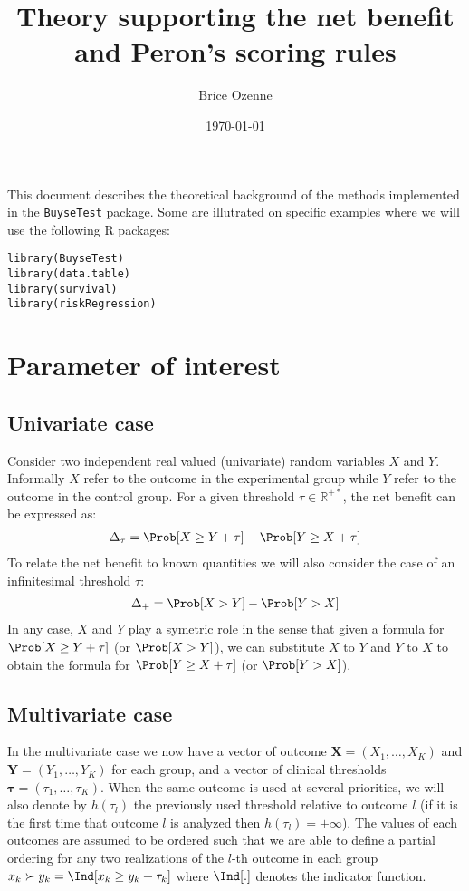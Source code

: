 \documentclass[12pt]{article}
\author{Brice Ozenne}
\date{\today}
\title{Theory supporting the net benefit and Peron's scoring rules}
\newcommand\VX{\mathbf{X}}
\newcommand\VY{\mathbf{Y}}
\newcommand\Vtau{\boldsymbol{\tau}}
\newcommand\Real{\mathbb{R}}
\begin{document}
\maketitle
This document describes the theoretical background of the methods
implemented in the \texttt{BuyseTest} package. Some are illutrated on
specific examples where we will use the following R packages:
\lstset{language=r,label= ,caption= ,captionpos=b,numbers=none}
\begin{lstlisting}
library(BuyseTest)
library(data.table)
library(survival)
library(riskRegression)
\end{lstlisting}

\bigskip

\tableofcontents

\clearpage

\section{Parameter of interest}
\label{sec:org1d8cd75}

\subsection{Univariate case}
\label{sec:org5ebb5d2}
Consider two independent real valued (univariate) random variables
\(X\) and \(Y\). Informally \(X\) refer to the outcome in the
experimental group while \(Y\) refer to the outcome in the control
group. For a given threshold \(\tau \in \Real^{+*}\), the net benefit
can be expressed as:
\begin{align*}
\Delta_\tau = \Prob[X \geq Y + \tau] - \Prob[Y \geq X + \tau]
\end{align*}
To relate the net benefit to known quantities we will also consider
the case of an infinitesimal threshold \(\tau\):
\begin{align*}
\Delta_+ = \Prob[X > Y] - \Prob[Y > X]
\end{align*}
In any case, \(X\) and \(Y\) play a symetric role in the sense that
given a formula for \(\Prob[X \geq Y+\tau]\) (or \(\Prob[X > Y]\)), we
can substitute \(X\) to \(Y\) and \(Y\) to \(X\) to obtain the formula
for \(\Prob[Y \geq X+\tau]\) (or \(\Prob[Y > X]\)).

\subsection{Multivariate case}
\label{sec:org320bdac}

In the multivariate case we now have a vector of outcome \(\VX =
(X_1,\ldots,X_K)\) and \(\VY = (Y_1,\ldots,Y_K)\) for each group, and
a vector of clinical thresholds \(\Vtau =
(\tau_1,\ldots,\tau_K)\). When the same outcome is used at several
priorities, we will also denote by \(h(\tau_l)\) the previously used
threshold relative to outcome \(l\) (if it is the first time that
outcome \(l\) is analyzed then \(h(\tau_l)=+\infty\)). The values of
each outcomes are assumed to be ordered such that we are able to
define a partial ordering for any two realizations of the \(l\)-th
outcome in each group \(x_k \succ y_k = \Ind[x_k \geq y_k + \tau_k]\) where \(\Ind[.]\) denotes the indicator function. 
\end{document}

